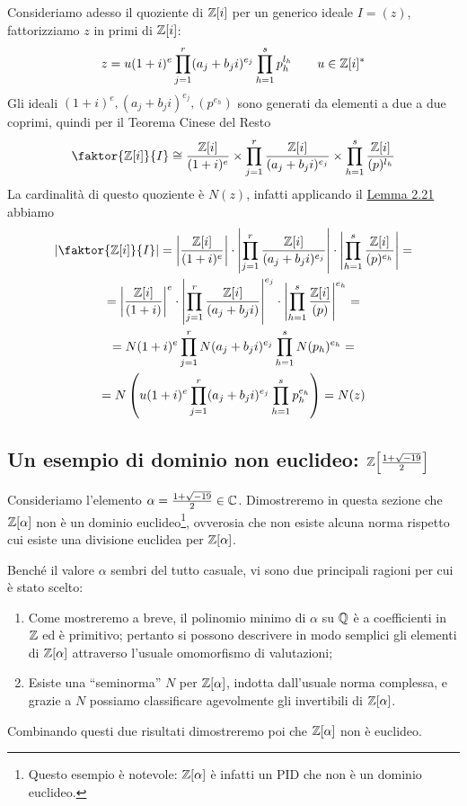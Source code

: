 \documentclass[11pt]{scrartcl}
\begin{document}
	Consideriamo adesso il quoziente di $\mathbb Z[i]$ per un generico ideale $I = (z)$,
	fattorizziamo $z$ in primi di $\mathbb Z[i]$:
	\[
	z = u(1 + i)^e\prod_{j = 1}^r (a_j + b_j i)^{e_j}\prod_{h = 1}^s p_h^{l_h}
	\qquad u \in \mathbb Z[i]^*
	\]
	Gli ideali $(1 + i)^e, (a_j + b_ji)^{e_j}, (p^{e_h})$ sono generati da elementi a due a due coprimi,
	quindi per il Teorema Cinese del Resto
	\[
	\faktor{\ZZ[i]}{I} \cong \frac{\ZZ[i]}{(1 + i)^e}\times
	\prod_{j = 1}^r\frac{\ZZ[i]}{(a_j + b_ji)^{e_j}}
	\times \prod_{h = 1}^s \frac{\ZZ[i]}{(p)^{l_h}}
	\]
	La cardinalità di questo quoziente è $N(z)$, infatti applicando il 
	\hyperref[lemma2.21]{Lemma 2.21} abbiamo
	\begin{multline*}
		\left|\faktor{\ZZ[i]}{I}\right| = \left|\frac{\ZZ[i]}{(1 + i)^e}\right|\cdot
		\left|\prod_{j = 1}^r\frac{\ZZ[i]}{(a_j + b_ji)^{e_j}}\right|\cdot
		\left|\prod_{h = 1}^s \frac{\ZZ[i]}{(p)^{e_h}}\right| = \\
		= \left|\frac{\ZZ[i]}{(1 + i)}\right|^e\cdot
		\left|\prod_{j = 1}^r\frac{\ZZ[i]}{(a_j + b_ji)}\right|^{e_j}\cdot
		\left|\prod_{h = 1}^s \frac{\ZZ[i]}{(p)}\right|^{e_h} = \\
		= N(1 + i)^e\prod_{j = 1}^r N(a_j + b_ji)^{e_j}\prod_{h = 1}^s N(p_h)^{e_h} = \\
		= N\left(u(1 + i)^e\prod_{j = 1}^r (a_j + b_j i)^{e_j}\prod_{h = 1}^s p_h^{e_h}\right)
		= N(z)\\
	\end{multline*}
	
	\newpage
	
	\subsection{Un esempio di dominio non euclideo: \texorpdfstring{{$\mathbb Z\!\left[\frac{1 + \sqrt{-19}}{2}\right]$}}{ℤ{[}(1+√−19)/2{]}}}
	
	Consideriamo l'elemento $\alpha = \frac{1 + \sqrt{-19}}{2} \in \mathbb C$. Dimostreremo
	in questa sezione che $\mathbb Z[\alpha]$ non è un dominio euclideo\footnote{
		Questo esempio è notevole: $\mathbb Z[\alpha]$ è infatti un PID che non
		è un dominio euclideo.
	}, ovverosia che
	non esiste alcuna norma rispetto cui esiste una divisione euclidea per
	$\mathbb Z[\alpha]$. \medskip
	
	
	Benché il valore $\alpha$ sembri del tutto casuale, vi sono due principali
	ragioni per cui è stato scelto:
	\begin{enumerate}[1.]
		\item Come mostreremo a breve, il polinomio minimo di $\alpha$ su $\mathbb Q$
		è a coefficienti in $\mathbb Z$ ed è primitivo; pertanto si possono descrivere
		in modo semplici gli elementi di $\mathbb Z[\alpha]$ attraverso
		l'usuale omomorfismo di valutazioni;
		\item Esiste una ``seminorma'' $N$ per $\mathbb Z[\alpha]$, indotta dall'usuale
		norma complessa, e grazie a $N$ possiamo classificare agevolmente gli
		invertibili di $\mathbb Z[\alpha]$.
	\end{enumerate}
	Combinando questi due risultati dimostreremo poi che $\mathbb Z[\alpha]$ non
	è euclideo. \medskip
	
\end{document}

